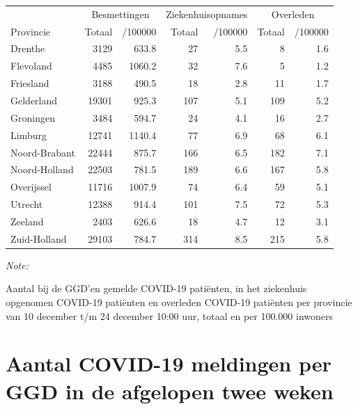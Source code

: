 \documentclass[
  english,
  man,floatsintext]{apa6}
\begin{document}
\begin{table}[H]
\centering
\begin{threeparttable}
\begin{tabular}{lrrrrrr}
\toprule
\multicolumn{1}{c}{ } & \multicolumn{2}{c}{Besmettingen} & \multicolumn{2}{c}{Ziekenhuisopnames} & \multicolumn{2}{c}{Overleden} \\
\cmidrule(l{3pt}r{3pt}){2-3} \cmidrule(l{3pt}r{3pt}){4-5} \cmidrule(l{3pt}r{3pt}){6-7}
Provincie & Totaal & /100000 & Totaal & /100000 & Totaal & /100000\\
\midrule
Drenthe & 3129 & 633.8 & 27 & 5.5 & 8 & 1.6\\
Flevoland & 4485 & 1060.2 & 32 & 7.6 & 5 & 1.2\\
Friesland & 3188 & 490.5 & 18 & 2.8 & 11 & 1.7\\
Gelderland & 19301 & 925.3 & 107 & 5.1 & 109 & 5.2\\
Groningen & 3484 & 594.7 & 24 & 4.1 & 16 & 2.7\\
Limburg & 12741 & 1140.4 & 77 & 6.9 & 68 & 6.1\\
Noord-Brabant & 22444 & 875.7 & 166 & 6.5 & 182 & 7.1\\
Noord-Holland & 22503 & 781.5 & 189 & 6.6 & 167 & 5.8\\
Overijssel & 11716 & 1007.9 & 74 & 6.4 & 59 & 5.1\\
Utrecht & 12388 & 914.4 & 101 & 7.5 & 72 & 5.3\\
Zeeland & 2403 & 626.6 & 18 & 4.7 & 12 & 3.1\\
Zuid-Holland & 29103 & 784.7 & 314 & 8.5 & 215 & 5.8\\
\bottomrule
\end{tabular}
\begin{tablenotes}
\item \textit{Note: } 
\item Aantal bij de GGD’en gemelde COVID-19 patiënten, in het ziekenhuis opgenomen COVID-19 patiënten en overleden COVID-19 patiënten per provincie van 10 december t/m 24 december 10:00 uur, totaal en per 100.000 inwoners
\end{tablenotes}
\end{threeparttable}
\end{table}

\newpage

\hypertarget{aantal-covid-19-meldingen-per-ggd-in-de-afgelopen-twee-weken}{%
\section{Aantal COVID-19 meldingen per GGD in de afgelopen twee weken}\label{aantal-covid-19-meldingen-per-ggd-in-de-afgelopen-twee-weken}}
\end{document}
